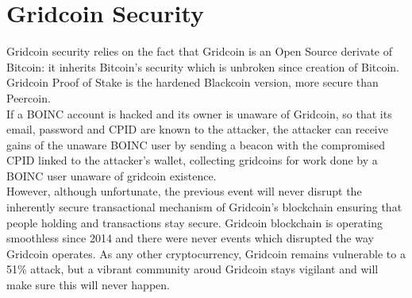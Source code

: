 \section{Gridcoin Security}

Gridcoin security relies on the fact that Gridcoin is an Open Source derivate of Bitcoin: it inherits Bitcoin's security which is unbroken since creation of Bitcoin. Gridcoin Proof of Stake is the hardened Blackcoin version, more secure than Peercoin.\\ 

If a BOINC account is hacked and its owner is unaware of Gridcoin, so that its email, password and CPID are known to the attacker, the attacker can receive gains of the unaware BOINC user by sending a beacon with the compromised CPID linked to the attacker's wallet, collecting gridcoins for work done by a BOINC user unaware of gridcoin existence.\\

However, although unfortunate, the previous event will never disrupt the inherently secure transactional mechanism of Gridcoin's blockchain ensuring that people holding and transactions stay secure. Gridcoin blockchain is operating smoothless since 2014 and there were never events which disrupted the way Gridcoin operates. As any other cryptocurrency, Gridcoin remains vulnerable to a 51\% attack, but a vibrant community aroud Gridcoin stays vigilant and will make sure this will never happen.